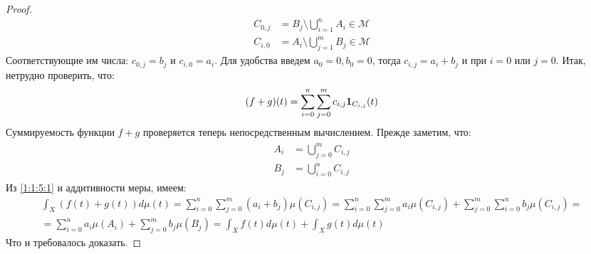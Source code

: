 \documentclass[../main.tex]{subfiles}
\begin{document}
\begin{proof}
	\begin{align*}
		C_{0, j} &= B_j \setminus \bigcup_{i=1}^{n}{A_i} \in \mathcal{M} \\
		C_{i, 0} &= A_i \setminus \bigcup_{j=1}^{m}{B_j} \in \mathcal{M}
	\end{align*}
	Соответствующие им числа: $c_{0, j} = b_j$ и $c_{i, 0} = a_i$. Для удобства введем $a_0 = 0, b_0 = 0$, тогда $c_{i, j} = a_i + b_j$ и при $i = 0$ или $j = 0$. Итак, нетрудно проверить, что:
	\begin{equation*}
		(f + g)(t) = \sum_{i=0}^{n}{\sum_{j=0}^{m}{c_{i,j} \mathbf{1}_{C_{i, j}} (t)}}
	\end{equation*}
	Суммируемость функции $f + g$ проверяется теперь непосредственным вычислением. Прежде заметим, что:
	\begin{align}\label{1:1:5:1}
		\begin{split}
			A_i &= \bigcup_{j=0}^{m}{C_{i, j}} \\
			B_j &= \bigcup_{i=0}^{n}{C_{i, j}}
		\end{split}
	\end{align}
	Из \eqref{1:1:5:1} и аддитивности меры, имеем:
	\begin{multline*}
		\int_{X}{(f(t) + g(t)) d\mu(t)} = \sum_{i=0}^{n}{\sum_{j=0}^{m}{(a_i + b_j)\mu(C_{i, j})}} = \sum_{i=0}^{n}{\sum_{j=0}^{m}{a_i \mu(C_{i, j})}} + \sum_{j=0}^{m}{\sum_{i=0}^{n}{b_j \mu(C_{i, j})}} = \\ = \sum_{i=0}^{n}{a_i \mu(A_i)} + \sum_{j=0}^{m}{b_j \mu(B_j)} = \int_{X}{f(t) d\mu(t)} + \int_{X}{g(t) d\mu(t)}
	\end{multline*}
	Что и требовалось доказать.
\end{proof}
\end{document}
